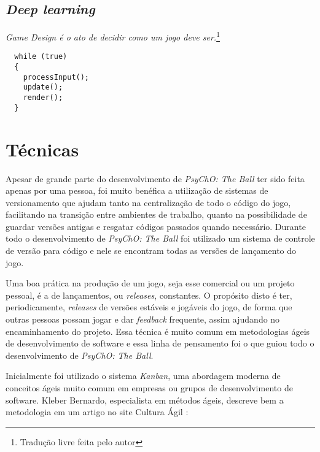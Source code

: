 \subsection{\textit{Deep learning}}
\label{sec:dl}


\begin{displayquote}
  \textit{Game Design é o ato de decidir como um jogo deve ser.}\footnote{Tradução livre feita pelo autor}
\end{displayquote}

\begin{lstlisting}
  while (true)
  {
    processInput();
    update();
    render();
  }
\end{lstlisting}

\section{Técnicas}
\label{sec:tecnicas}

Apesar de grande parte do desenvolvimento de \textit{PsyChO: The Ball} ter sido feita apenas por uma pessoa, foi muito benéfica a utilização de sistemas de versionamento que ajudam tanto na centralização de todo o código do jogo, facilitando na transição entre ambientes de trabalho, quanto na possibilidade de guardar versões antigas e resgatar códigos passados quando necessário. Durante todo o desenvolvimento de \textit{PsyChO: The Ball} foi utilizado um sistema de controle de versão para código e nele se encontram todas as versões de lançamento do jogo.

Uma boa prática na produção de um jogo, seja esse comercial ou um projeto pessoal, é a de lançamentos, ou \textit{releases}, constantes. O propósito disto é ter, periodicamente, \textit{releases} de versões estáveis e jogáveis do jogo, de forma que outras pessoas possam jogar e dar \textit{feedback} frequente, assim ajudando no encaminhamento do projeto. Essa técnica é muito comum em metodologias ágeis de desenvolvimento de software e essa linha de pensamento foi o que guiou todo o desenvolvimento de \textit{PsyChO: The Ball}.

Inicialmente foi utilizado o sistema \textit{Kanban}, uma abordagem moderna de conceitos ágeis muito comum em empresas ou grupos de desenvolvimento de software. Kleber Bernardo, especialista em métodos ágeis, descreve bem a metodologia em um artigo no site Cultura Ágil \cite{kleberkanban}:


